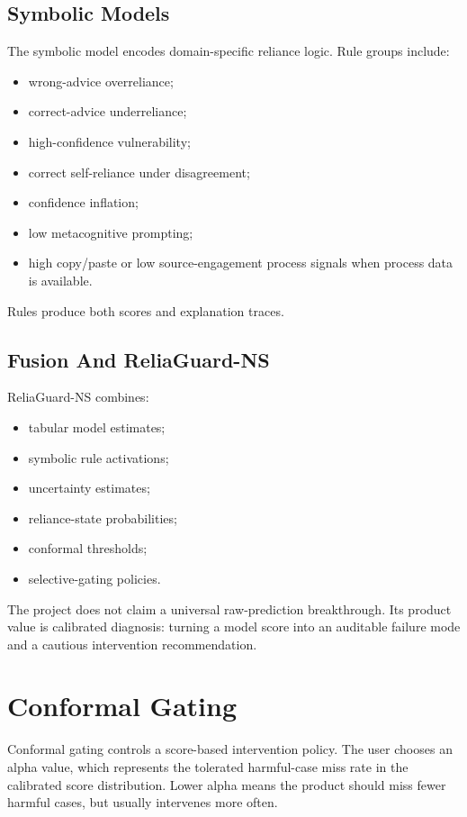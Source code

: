 \documentclass[11pt]{article}
\newcommand{\model}{ReliaGuard-NS}
\begin{document}
\subsection{Symbolic Models}

The symbolic model encodes domain-specific reliance logic. Rule groups include:

\begin{itemize}[leftmargin=*]
  \item wrong-advice overreliance;
  \item correct-advice underreliance;
  \item high-confidence vulnerability;
  \item correct self-reliance under disagreement;
  \item confidence inflation;
  \item low metacognitive prompting;
  \item high copy/paste or low source-engagement process signals when process data is available.
\end{itemize}

Rules produce both scores and explanation traces.

\subsection{Fusion And ReliaGuard-NS}

\model{} combines:

\begin{itemize}[leftmargin=*]
  \item tabular model estimates;
  \item symbolic rule activations;
  \item uncertainty estimates;
  \item reliance-state probabilities;
  \item conformal thresholds;
  \item selective-gating policies.
\end{itemize}

The project does not claim a universal raw-prediction breakthrough. Its product value is calibrated diagnosis: turning a model score into an auditable failure mode and a cautious intervention recommendation.

\section{Conformal Gating}

Conformal gating controls a score-based intervention policy. The user chooses an alpha value, which represents the tolerated harmful-case miss rate in the calibrated score distribution. Lower alpha means the product should miss fewer harmful cases, but usually intervenes more often.
\end{document}
